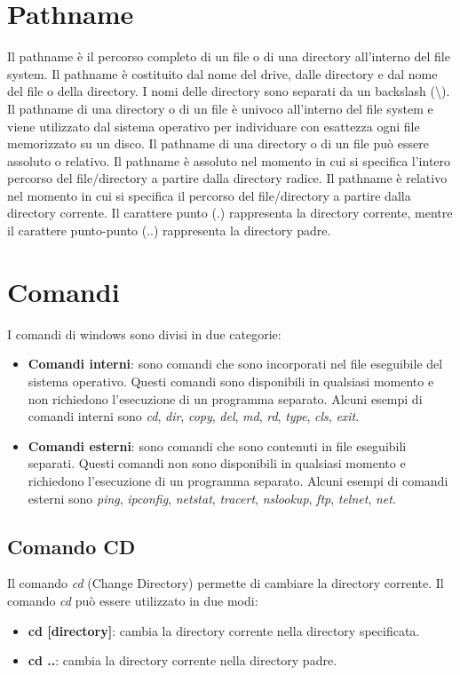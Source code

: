 \documentclass[12pt]{report}
\begin{document}
	\section{Pathname}
	Il pathname è il percorso completo di un file o di una directory all'interno del file system. Il pathname è costituito dal nome del drive, dalle directory e dal nome del file o della directory. I nomi delle directory sono separati da un backslash (\textbackslash). Il pathname di una directory o di un file è univoco all'interno del file system e viene utilizzato dal sistema operativo per individuare con esattezza ogni file memorizzato su un disco. Il pathname di una directory o di un file può essere assoluto o relativo. Il pathname è assoluto nel momento in cui si specifica l'intero percorso del file/directory a partire dalla directory radice. Il pathname è relativo nel momento in cui si specifica il percorso del file/directory a partire dalla directory corrente. Il carattere punto (.) rappresenta la directory corrente, mentre il carattere punto-punto (..) rappresenta la directory padre.

	\section{Comandi}
	I comandi di windows sono divisi in due categorie:
	\begin{itemize}
		\item \textbf{Comandi interni}: sono comandi che sono incorporati nel file eseguibile del sistema operativo. Questi comandi sono disponibili in qualsiasi momento e non richiedono l'esecuzione di un programma separato. Alcuni esempi di comandi interni sono \textit{cd}, \textit{dir}, \textit{copy}, \textit{del}, \textit{md}, \textit{rd}, \textit{type}, \textit{cls}, \textit{exit}.
		\item \textbf{Comandi esterni}: sono comandi che sono contenuti in file eseguibili separati. Questi comandi non sono disponibili in qualsiasi momento e richiedono l'esecuzione di un programma separato. Alcuni esempi di comandi esterni sono \textit{ping}, \textit{ipconfig}, \textit{netstat}, \textit{tracert}, \textit{nslookup}, \textit{ftp}, \textit{telnet}, \textit{net}.
	\end{itemize}

	\subsection{Comando CD}
	Il comando \textit{cd} (Change Directory) permette di cambiare la directory corrente. Il comando \textit{cd} può essere utilizzato in due modi:
	\begin{itemize}
		\item \textbf{cd [directory]}: cambia la directory corrente nella directory specificata.
		\item \textbf{cd ..}: cambia la directory corrente nella directory padre.
	\end{itemize}
\end{document}
